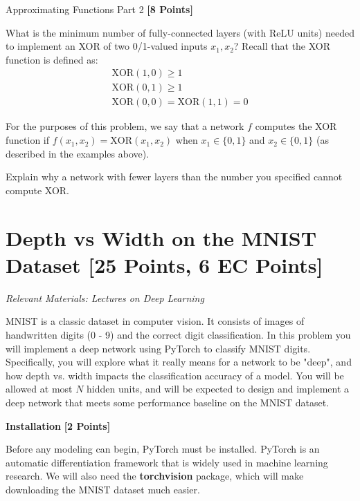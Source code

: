 \begin{subsolution}


\end{subsolution}

\problem Approximating Functions Part 2 \textbf{[8 Points]}

What is the minimum number of fully-connected layers (with ReLU units) needed to implement an XOR of two 0/1-valued inputs $x_1, x_2$? Recall that the XOR function is defined as:
\begin{gather*}
\text{XOR}(1, 0) \geq 1 \\
\text{XOR}(0, 1) \geq 1 \\
\text{XOR}(0, 0) = \text{XOR}(1, 1) = 0
\end{gather*}

For the purposes of this problem, we say that a network $f$ computes the XOR function if $f(x_1, x_2) = \text{XOR}(x_1, x_2)$ when $x_1 \in \{0, 1\}$ and $x_2 \in \{0, 1\}$ (as described in the examples above).

Explain why a network with fewer layers than the number you specified cannot compute XOR.


\begin{subsolution}


\end{subsolution}


\newpage
\section{Depth vs Width on the MNIST Dataset  [25 Points, 6 EC Points]}

\textit{Relevant Materials: Lectures on Deep Learning}

MNIST is a classic dataset in computer vision. It consists of images of handwritten digits (0 - 9) and the correct digit classification. In this problem you will implement a deep network using PyTorch to classify MNIST digits. Specifically, you will explore what it really means for a network to be "deep", and how depth vs. width impacts the classification accuracy of a model. You will be allowed at most $N$ hidden units, and will be expected to design and implement a deep network that meets some performance baseline on the MNIST dataset.

\medskip

\problem \textbf{Installation} \textbf{[2 Points]}


Before any modeling can begin, PyTorch must be installed. PyTorch is an automatic differentiation framework that is widely used in machine learning research.  We will also need the \textbf{torchvision} package, which will make downloading the MNIST dataset much easier. 

